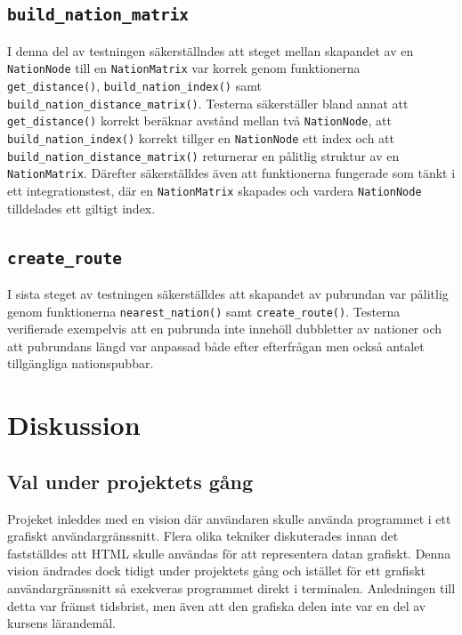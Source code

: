 \documentclass[a4paper, 12pt]{article}
\begin{document}
    \subsection{\texttt{build\_nation\_matrix}}
    \label{subsec: build_nation_matrix}
        I denna del av testningen säkerställndes att steget mellan skapandet av en \texttt{NationNode} till en \texttt{NationMatrix} var korrek genom funktionerna \texttt{get\_distance()}, \texttt{build\_nation\_index()} samt \texttt{build\_nation\_distance\_matrix()}. Testerna säkerställer bland annat att \texttt{get\_distance()} korrekt beräknar avstånd mellan två \texttt{NationNode}, att \texttt{build\_nation\_index()} korrekt tillger en \texttt{NationNode} ett index och att \texttt{build\_nation\_distance\_matrix()} returnerar en pålitlig struktur av en \texttt{NationMatrix}. Därefter säkerställdes även att funktionerna fungerade som tänkt i ett integrationstest, där en \texttt{NationMatrix} skapades och vardera \texttt{NationNode} tilldelades ett giltigt index.

    \subsection{\texttt{create\_route}}
    \label{subsec: create_route}
        I sista steget av testningen säkerställdes att skapandet av pubrundan var pålitlig genom funktionerna \texttt{nearest\_nation()} samt \texttt{create\_route()}. Testerna verifierade exempelvis att en pubrunda inte innehöll dubbletter av nationer och att pubrundans längd var anpassad både efter efterfrågan men också antalet tillgängliga nationspubbar.

\section{Diskussion}
\label{sec: diskussion}
    \subsection{Val under projektets gång}
    \label{subsec: val}
        Projeket inleddes med en vision där användaren skulle använda programmet i ett grafiskt användargränssnitt. Flera olika tekniker diskuterades innan det fastställdes att HTML skulle användas för att representera datan grafiskt. Denna vision ändrades dock tidigt under projektets gång och istället för ett grafiskt användargränssnitt så exekveras programmet direkt i terminalen. Anledningen till detta var främst tidsbrist, men även att den grafiska delen inte var en del av kursens lärandemål.
\end{document}
